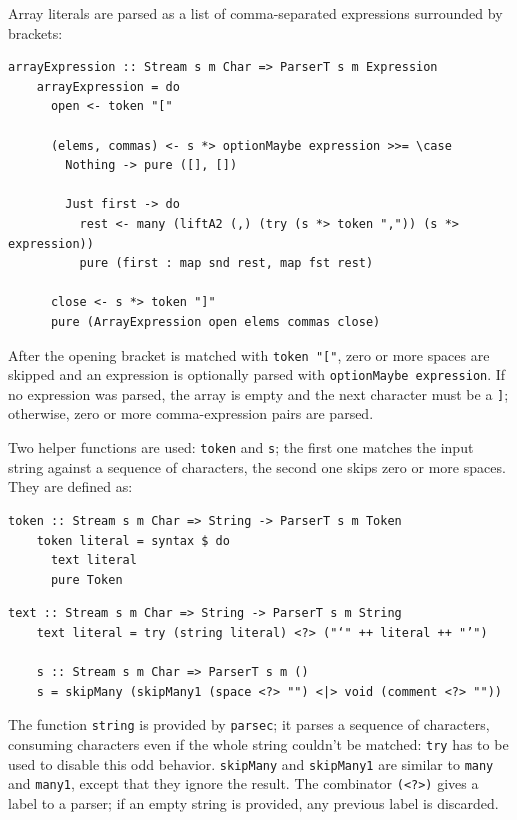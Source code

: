 \documentclass[UdineBachThesis,american,11pt]{PhdThesis}
\begin{document}
  Array literals are parsed as a list of comma-separated expressions surrounded
  by brackets:

  \begin{Verbatim}[gobble=4,fontsize=\small]
    arrayExpression :: Stream s m Char => ParserT s m Expression
    arrayExpression = do
      open <- token "["

      (elems, commas) <- s *> optionMaybe expression >>= \case
        Nothing -> pure ([], [])

        Just first -> do
          rest <- many (liftA2 (,) (try (s *> token ",")) (s *> expression))
          pure (first : map snd rest, map fst rest)

      close <- s *> token "]"
      pure (ArrayExpression open elems commas close)
  \end{Verbatim}

  After the opening bracket is matched with \mbox{\texttt{token "["}}, zero or
  more spaces are skipped and an expression is optionally parsed with
  \mbox{\texttt{optionMaybe expression}}. If no expression was parsed, the array
  is empty and the next character must be a \texttt{]}; otherwise, zero or more
  comma-expression pairs are parsed.

  Two helper functions are used: \mbox{\texttt{token}} and \texttt{s}; the first
  one matches the input string against a sequence of characters, the second one
  skips zero or more spaces. They are defined as:

  \begin{Verbatim}[gobble=4,fontsize=\small]
    token :: Stream s m Char => String -> ParserT s m Token
    token literal = syntax $ do
      text literal
      pure Token
  \end{Verbatim}

  \pagebreak

  \begin{Verbatim}[gobble=4,fontsize=\small]
    text :: Stream s m Char => String -> ParserT s m String
    text literal = try (string literal) <?> ("‘" ++ literal ++ "’")

    s :: Stream s m Char => ParserT s m ()
    s = skipMany (skipMany1 (space <?> "") <|> void (comment <?> ""))
  \end{Verbatim}

  The function \mbox{\texttt{string}} is provided by \mbox{\texttt{parsec}}; it
  parses a sequence of characters, consuming characters even if the whole string
  couldn't be matched: \mbox{\texttt{try}} has to be used to disable this odd
  behavior. \mbox{\texttt{skipMany}} and \mbox{\texttt{skipMany1}} are similar
  to \mbox{\texttt{many}} and \mbox{\texttt{many1}}, except that they ignore the
  result. The combinator \mbox{\texttt{(<?>)}} gives a label to a parser; if an
  empty string is provided, any previous label is discarded.
\end{document}
